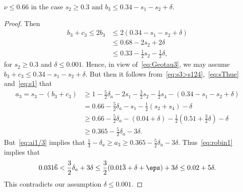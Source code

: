 \begin{lemma}\label{lem:Subcase1.1}
  \leanok
  $\nu \leq 0.66$ in the case $s_2 \geq 0.3$ and $b_3\le 0.34-s_1-s_2+\delta$.
\end{lemma}
\begin{proof}
  \leanok
  Then
  \begin{align*}
  b_3+c_3\le 2b_3
  &\le 2(0.34-s_1-s_2+\delta)\\
  &\le 0.68-2s_2 +2\delta \\
  &\leq 0.33 -\frac{1}{2}s_2-\frac{1}{2}\delta,
  \end{align*}
  for $s_2\ge0.3$ and $\delta\leq 0.001$.
  Hence, in view of~\eqref{eq:Geotau3}, we may assume $b_3+c_3\le 0.34-s_1-s_2+\delta$.
  But then it follows from~\eqref{eq:s3>s124},~\eqref{eq:sThue} and~\eqref{eq:s1} that
  \begin{align*}
  a_3 = s_3 - (b_3 + c_3)
  & \ge 1 -
  \frac{5}{2}\delta_a-
  2s_1 - \frac{3}{2}s_2 - \frac{1}{2}s_4 - (0.34-s_1-s_2+\delta)\\
  & = 0.66
  -\frac{5}{2}\delta_a
  - s_1 - \frac{1}{2}(s_2 + s_4)-\delta\\
  & \geq 0.66
  -\frac{5}{2}\delta_a
  - (0.04+\delta) - \frac{1}{2}(0.51+\frac{3}{2}\delta)-\delta\\
  &\ge 0.365
  -\frac{5}{2}\delta_a -3\delta.
  \end{align*}
  But~\eqref{eq:ai1/3} implies that $\frac{1}{3}-\delta_a \ge a_3\geq 0.365
  -\frac{5}{2}\delta_a -3\delta$. Thus~\eqref{eq:robin1} implies that
  \[
  0.031\bar 6<\frac{3}{2}\delta_a +3\delta
  \leq \frac{3}{2}(0.01\bar{3}+\delta+\eps) +3\delta \le 0.02+5\delta.
  \]
  This contradicts our assumption $\delta\leq 0.001$.
\end{proof}

